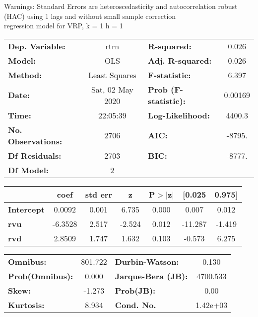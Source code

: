 Warnings: \newline
 [1] Standard Errors are heteroscedasticity and autocorrelation robust (HAC) using 1 lags and without small sample correction\\ 

regression model for VRP, k = 1 h = 1\begin{center}
\begin{tabular}{lclc}
\toprule
\textbf{Dep. Variable:}    &       rtrn       & \textbf{  R-squared:         } &     0.026   \\
\textbf{Model:}            &       OLS        & \textbf{  Adj. R-squared:    } &     0.026   \\
\textbf{Method:}           &  Least Squares   & \textbf{  F-statistic:       } &     6.397   \\
\textbf{Date:}             & Sat, 02 May 2020 & \textbf{  Prob (F-statistic):} &  0.00169    \\
\textbf{Time:}             &     22:05:39     & \textbf{  Log-Likelihood:    } &    4400.3   \\
\textbf{No. Observations:} &        2706      & \textbf{  AIC:               } &    -8795.   \\
\textbf{Df Residuals:}     &        2703      & \textbf{  BIC:               } &    -8777.   \\
\textbf{Df Model:}         &           2      & \textbf{                     } &             \\
\bottomrule
\end{tabular}
\begin{tabular}{lcccccc}
                   & \textbf{coef} & \textbf{std err} & \textbf{z} & \textbf{P$> |$z$|$} & \textbf{[0.025} & \textbf{0.975]}  \\
\midrule
\textbf{Intercept} &       0.0092  &        0.001     &     6.735  &         0.000        &        0.007    &        0.012     \\
\textbf{rvu}       &      -6.3528  &        2.517     &    -2.524  &         0.012        &      -11.287    &       -1.419     \\
\textbf{rvd}       &       2.8509  &        1.747     &     1.632  &         0.103        &       -0.573    &        6.275     \\
\bottomrule
\end{tabular}
\begin{tabular}{lclc}
\textbf{Omnibus:}       & 801.722 & \textbf{  Durbin-Watson:     } &    0.130  \\
\textbf{Prob(Omnibus):} &   0.000 & \textbf{  Jarque-Bera (JB):  } & 4700.533  \\
\textbf{Skew:}          &  -1.273 & \textbf{  Prob(JB):          } &     0.00  \\
\textbf{Kurtosis:}      &   8.934 & \textbf{  Cond. No.          } & 1.42e+03  \\
\bottomrule
\end{tabular}
\end{center}

